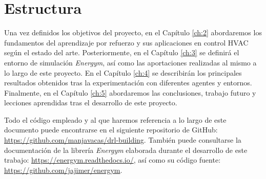 \section{Estructura}

Una vez definidos los objetivos del proyecto, en el Capítulo \ref{ch:2} abordaremos los fundamentos del aprendizaje por refuerzo y sus aplicaciones en control HVAC según el estado del arte. Posteriormente, en el Capítulo \ref{ch:3} se definirá el entorno de simulación \textit{Energym}, así como las aportaciones realizadas al mismo a lo largo de este proyecto. En el Capítulo \ref{ch:4} se describirán los principales resultados obtenidos tras la experimentación con diferentes agentes y entornos. Finalmente, en el Capítulo \ref{ch:5} abordaremos las conclusiones, trabajo futuro y lecciones aprendidas tras el desarrollo de este proyecto.

Todo el código empleado y al que haremos referencia a lo largo de este documento puede encontrarse en el siguiente repositorio de GitHub: \url{https://github.com/manjavacas/drl-building}. También puede consultarse la documentación de la librería \textit{Energym} elaborada durante el desarrollo de este trabajo: \url{https://energym.readthedocs.io/}, así como su código fuente: \url{https://github.com/jajimer/energym}.

